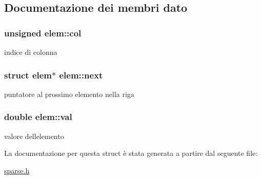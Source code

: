 \subsection{Documentazione dei membri dato}
\subsubsection[{\texorpdfstring{col}{col}}]{\setlength{\rightskip}{0pt plus 5cm}unsigned elem\+::col}\hypertarget{structelem_aca409f3a7c1c9621b262a230c78ef37b}{}\label{structelem_aca409f3a7c1c9621b262a230c78ef37b}
indice di colonna 
\subsubsection[{\texorpdfstring{next}{next}}]{\setlength{\rightskip}{0pt plus 5cm}struct {\bf elem}$\ast$ elem\+::next}\hypertarget{structelem_ab9cf5c2e1c9a0ec2938275b90d39d5ca}{}\label{structelem_ab9cf5c2e1c9a0ec2938275b90d39d5ca}
puntatore al prossimo elemento nella riga 
\subsubsection[{\texorpdfstring{val}{val}}]{\setlength{\rightskip}{0pt plus 5cm}double elem\+::val}\hypertarget{structelem_a52a0b099052bdf7611aa32acdb3f5449}{}\label{structelem_a52a0b099052bdf7611aa32acdb3f5449}
valore dell\textquotesingle{}elemento 

La documentazione per questa struct è stata generata a partire dal seguente file\+:\begin{DoxyCompactItemize}
\item 
\hyperlink{sparse_8h}{sparse.\+h}\end{DoxyCompactItemize}
